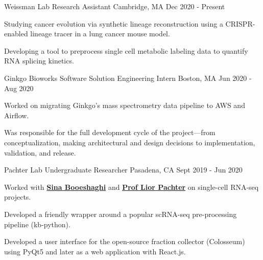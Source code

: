 

\begin{cventries}

\cventry
  {Weissman Lab} %
  {Research Assistant} %
  {Cambridge, MA} %
  {Dec 2020 - Present} %
  {
    \begin{cvitems} %
      \item {Studying cancer evolution via synthetic lineage reconstruction using a CRISPR-enabled lineage tracer in a lung cancer mouse model.}
      \item {Developing a tool to preprocess single cell metabolic labeling data to quantify RNA splicing kinetics.}
    \end{cvitems}
  }

  \cventry
    {Ginkgo Bioworks} %
    {Software Solution Engineering Intern} %
    {Boston, MA} %
    {Jun 2020 - Aug 2020} %
    {
      \begin{cvitems} %
        \item {Worked on migrating Ginkgo's mass spectrometry data pipeline to AWS and Airflow.}
        \item {Was responsible for the full development cycle of the project---from conceptualization, making architectural and design decisions to implementation, validation, and release.}
      \end{cvitems}
    }

\cventry
  {Pachter Lab} %
  {Undergraduate Researcher} %
  {Pasadena, CA} %
  {Sept 2019 - Jun 2020} %
  {
    \begin{cvitems} %
      \item {Worked with \textbf{\href{https://sinabooeshaghi.com/}{Sina Booeshaghi}} and \textbf{\href{https://pachterlab.github.io/biography.html}{Prof Lior Pachter}} on single-cell RNA-seq projects.}
      \item {Developed a friendly wrapper around a popular scRNA-seq pre-processing pipeline (kb-python).}
      \item {Developed a user interface for the open-source fraction collector (Colosseum) using PyQt5 and later as a web application with React.js.}
    \end{cvitems}
  }


\end{cventries}
